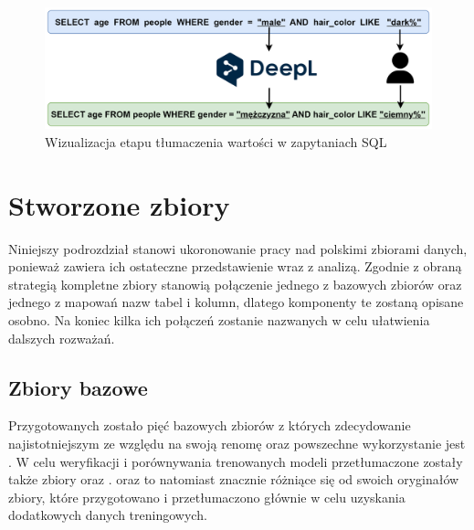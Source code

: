 \begin{figure}[ht!]
  \centering
  \includegraphics[width=1.0\linewidth]{images/value_translation.png}
  \caption{Wizualizacja etapu tłumaczenia wartości w zapytaniach SQL}
  \label{fig:value-translation}
\end{figure}

\section{Stworzone zbiory}
Niniejszy podrozdział stanowi ukoronowanie pracy nad polskimi zbiorami danych, ponieważ zawiera ich ostateczne przedstawienie wraz 
z analizą. Zgodnie z obraną strategią kompletne zbiory stanowią połączenie jednego z bazowych zbiorów oraz jednego z mapowań nazw tabel i kolumn, dlatego komponenty te zostaną opisane osobno. Na koniec kilka ich połączeń zostanie nazwanych w celu ułatwienia dalszych rozważań.


\subsection{Zbiory bazowe}
Przygotowanych zostało pięć bazowych zbiorów z których zdecydowanie najistotniejszym ze względu na swoją renomę oraz powszechne wykorzystanie jest . W celu weryfikacji i porównywania trenowanych modeli przetłumaczone zostały także zbiory  oraz .  oraz  to natomiast znacznie różniące się od swoich oryginałów zbiory, które przygotowano i przetłumaczono głównie w celu uzyskania dodatkowych danych treningowych.


